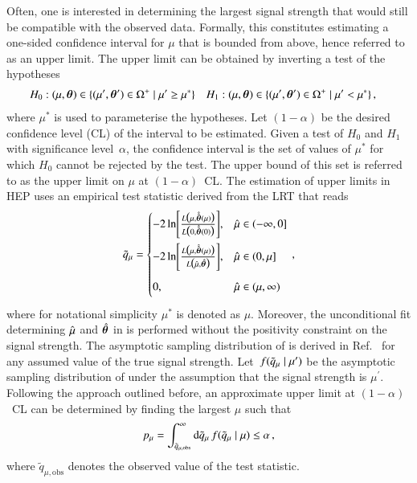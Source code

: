 Often, one is interested in determining the largest signal strength that would
still be compatible with the observed data. Formally, this constitutes
estimating a one-sided confidence interval for $\mu$ that is bounded from above,
hence referred to as an upper limit. The upper limit can be obtained by
inverting a test of the hypotheses
\begin{align*}
  &H_0: (\mu, \bm{\theta}) \in \{ (\mu^\prime, \bm{\theta}^\prime) \in \Omega^+ \mid \mu^\prime \geq \mu^* \}
  &&H_1: (\mu, \bm{\theta}) \in \{ (\mu^\prime, \bm{\theta}^\prime) \in \Omega^+ \mid \mu^\prime < \mu^* \} \,\text{,}
\end{align*}
where $\mu^*$ is used to parameterise the hypotheses. Let $(1 - \alpha)$ be the
desired confidence level (CL) of the interval to be estimated. Given a test of
$H_0$ and $H_1$ with significance level~$\alpha$, the confidence interval is the
set of values of $\mu^*$ for which $H_0$ cannot be rejected by the test. The
upper bound of this set is referred to as the upper limit on $\mu$ at
$(1 - \alpha)$~CL. The estimation of upper limits in HEP uses an empirical test
statistic derived from the LRT that reads~\cite{Cowan:2010js}
\begin{align}
  \tilde{q}_{\mu} =
  \begin{cases}
    -2\ln\mathopen{}\left[ \frac{ L\bigl( \mu, \hat{\hat{\bm{\theta}}}(\mu) \bigr)}{L\bigl( 0, \hat{\hat{\bm{\theta}}}(0) \bigr)} \right]\mathclose{}, & \hat{\mu} \in (-\infty, 0] \\[1em]
    -2\ln\mathopen{}\left[ \frac{ L\bigl( \mu, \hat{\hat{\bm{\theta}}}(\mu) \bigr)}{L\bigl( \hat{\mu}, \hat{\bm{\theta}} \bigr)} \right]\mathclose{}, & \hat{\mu} \in (0, \mu] \\[1em]
    0,\phantom{ \biggl[  \biggr]} & \hat{\mu} \in (\mu, \infty) \\
  \end{cases} \,\text{,}
  \label{eq:qmutilde}
\end{align}
where for notational simplicity $\mu^*$ is denoted as $\mu$. Moreover, the
unconditional fit determining $\hat{\mu}$ and $\hat{\bm{\theta}}$ in
 is performed without the positivity constraint on the signal
strength. The asymptotic sampling distribution of \qmutilde is derived in
Ref.~\cite{Cowan:2010js} for any assumed value of the true signal strength.
Let~$f(\tilde{q}_{\mu} \mid \mu^\prime)$ be the asymptotic sampling distribution of
\qmutilde under the assumption that the signal strength is
$\mu^\prime$. Following the approach outlined before, an approximate upper limit
at $(1 - \alpha)$~CL can be determined by finding the largest $\mu$ such that
\begin{align*}
  p_\mu = \int_{\tilde{q}_{\mu, \text{obs}}}^{\infty} \mathrm{d}\tilde{q}_{\mu} \, f(\tilde{q}_{\mu} \mid \mu) \leq \alpha \,\text{,}
\end{align*}
where $\tilde{q}_{\mu, \text{obs}}$ denotes the observed value of the test
statistic.

